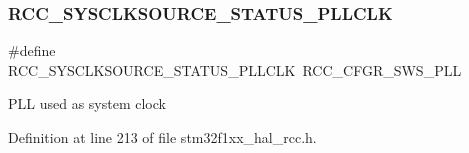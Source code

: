\subsubsection{\texorpdfstring{R\+C\+C\+\_\+\+S\+Y\+S\+C\+L\+K\+S\+O\+U\+R\+C\+E\+\_\+\+S\+T\+A\+T\+U\+S\+\_\+\+P\+L\+L\+C\+LK}{RCC\_SYSCLKSOURCE\_STATUS\_PLLCLK}}
{\footnotesize\ttfamily \#define R\+C\+C\+\_\+\+S\+Y\+S\+C\+L\+K\+S\+O\+U\+R\+C\+E\+\_\+\+S\+T\+A\+T\+U\+S\+\_\+\+P\+L\+L\+C\+LK~R\+C\+C\+\_\+\+C\+F\+G\+R\+\_\+\+S\+W\+S\+\_\+\+P\+LL}

P\+LL used as system clock 

Definition at line 213 of file stm32f1xx\+\_\+hal\+\_\+rcc.\+h.

